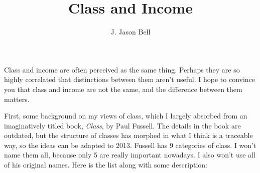 \documentclass[11pt, oneside]{article}   	%
\title{Class and Income}
\author{J. Jason Bell}
\begin{document}
\maketitle

Class and income are often perceived as the same thing.  Perhaps they are so highly correlated that distinctions between them aren't useful.  I hope to convince you that class and income are not the same, and the difference between them matters.

First, some background on my views of class, which I largely absorbed from an imaginatively titled book, \textit{Class}, by Paul Fussell.  The details in the book are outdated, but the structure of classes has morphed in what I think is a traceable way, so the ideas can be adapted to 2013.  Fussell has 9 categories of class.  I won't name them all, because only 5 are really important nowadays.  I also won't use all of his original names.  Here is the list along with some description:
\end{document}
